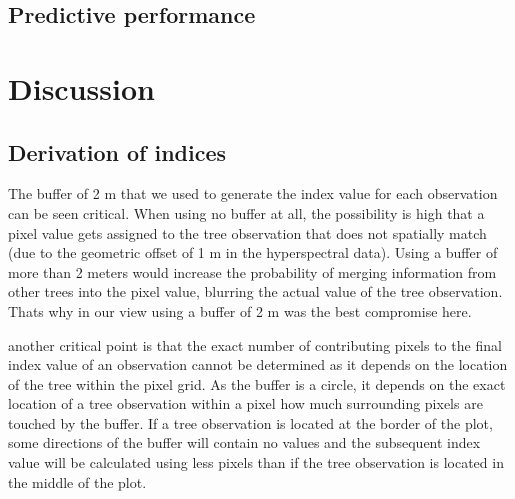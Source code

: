 \documentclass[review]{elsarticle}
\begin{document}


\subsection{Predictive performance}

\section{Discussion}

\subsection{Derivation of indices}

\noindent The buffer of 2 m that we used to generate the index value for each observation can be seen critical.
When using no buffer at all, the possibility is high that a pixel value gets assigned to the tree observation that does not spatially match (due to the geometric offset of 1 m in the hyperspectral data).
Using a buffer of more than 2 meters would increase the probability of merging information from other trees into the pixel value, blurring the actual value of the tree observation.
Thats why in our view using a buffer of 2 m was the best compromise here.

another critical point is that the exact number of contributing pixels to the final index value of an observation cannot be determined as it depends on the location of the tree within the pixel grid.
As the buffer is a circle, it depends on the exact location of a tree observation within a pixel how much surrounding pixels are touched by the buffer.
If a tree observation is located at the border of the plot, some directions of the buffer will contain no values and the subsequent index value will be calculated using less pixels than if the tree observation is located in the middle of the plot.
\end{document}
